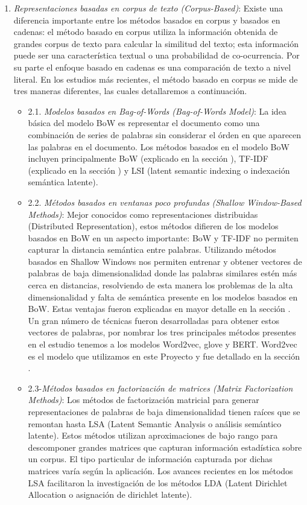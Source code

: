 \documentclass[12pt,a4paper]{article}
\begin{document}
\begin{sloppypar}
\begin{enumerate}
\item \textit{Representaciones basadas en corpus de texto (Corpus-Based)}: Existe una diferencia importante entre los métodos basados en corpus y basados en cadenas: el método basado en corpus utiliza la información obtenida de grandes corpus de texto para calcular la similitud del texto; esta información puede ser una característica textual o una probabilidad de co-ocurrencia. Por su parte el enfoque basado en cadenas es una comparación de texto a nivel literal. En los estudios más recientes, el método basado en corpus se mide de tres maneras diferentes, las cuales detallaremos a continuación. 

\begin{itemize}
\item 2.1. \textit{Modelos basados en Bag-of-Words (Bag-of-Words Model)}:  La idea básica del modelo BoW es representar el documento como una combinación de series de palabras sin considerar el órden en que aparecen las palabras en el documento. Los métodos basados en el modelo BoW incluyen principalmente BoW (explicado en la sección \textit{}), TF-IDF (explicado en la sección \textit{}) y LSI (latent semantic indexing o indexación semántica latente).

\item 2.2. \textit{Métodos basados en ventanas poco profundas (Shallow Window-Based Methods)}: Mejor conocidos como representaciones distribuidas (Distributed Representation), estos métodos difieren de los modelos basados en BoW en un aspecto importante: BoW y TF-IDF no permiten capturar la distancia semántica entre palabras. Utilizando métodos basados en Shallow Windows nos permiten entrenar y obtener vectores de palabras de baja dimensionalidad donde las palabras similares estén más cerca en distancias, resolviendo de esta manera los problemas de la alta dimensionalidad y falta de semántica presente en los modelos basados en BoW. Estas ventajas fueron explicadas en mayor detalle en la sección \textit{}. Un gran número de técnicas fueron desarrolladas para obtener estos vectores de palabras, por nombrar los tres principales métodos presentes en el estudio tenemos a los modelos Word2vec, glove y BERT. Word2vec es el modelo que utilizamos en este Proyecto y fue detallado en la sección \textit{}.

\item 2.3-\textit{Métodos basados en factorización de matrices (Matrix Factorization Methods)}: Los métodos de factorización matricial para generar representaciones de palabras de baja dimensionalidad tienen raíces que se remontan hasta LSA (Latent Semantic Analysis o análisis semántico latente). Estos métodos utilizan aproximaciones de bajo rango para descomponer grandes matrices que capturan información estadística sobre un corpus. El tipo particular de información capturada por dichas matrices varía según la aplicación. Los avances recientes en los métodos LSA facilitaron la investigación de los métodos LDA (Latent Dirichlet Allocation o asignación de dirichlet latente).
\end{itemize}


\end{enumerate}
\end{sloppypar}
\end{document}
